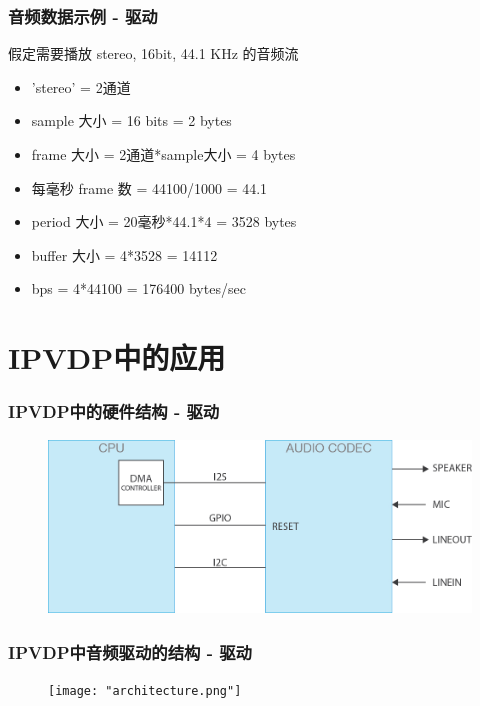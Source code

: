 \documentclass[CJK]{beamer}
\begin{document}
\begin{frame}
    \frametitle{音频数据示例 - 驱动}

    \begin{alertblock}{}
        假定需要播放 stereo, 16bit, 44.1 KHz 的音频流
    \end{alertblock}
    \pause
    \begin{exampleblock}{}
        \begin{itemize}
            \item 'stereo' = 2通道
            \item sample 大小 = 16 bits = 2 bytes
            \item frame 大小 = 2通道*sample大小 = 4 bytes
            \item 每毫秒 frame 数 = 44100/1000 = 44.1 
            \item period 大小 = 20毫秒*44.1*4 = 3528 bytes
            \item buffer 大小 = 4*3528 = 14112
            \item bps = 4*44100 = 176400 bytes/sec
        \end{itemize}
    \end{exampleblock}
\end{frame}

\section{IPVDP中的应用}
\begin{frame}
    \frametitle{IPVDP中的硬件结构 - 驱动}
    \begin{figure}
        \includegraphics[height=120bp]{"hw_arch.jpg"}
    \end{figure}
\end{frame}

\begin{frame}[t]
    \frametitle{IPVDP中音频驱动的结构 - 驱动}
    \begin{figure}
        \texttt{[image: "architecture.png"]}
    \end{figure}
\end{frame}
\end{document}
